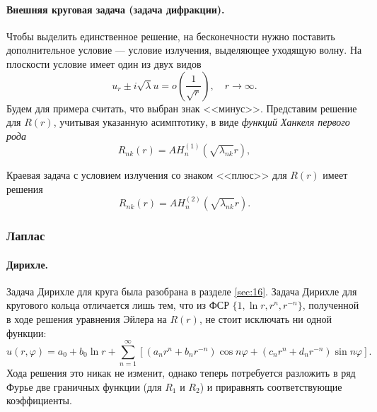 \paragraph{Внешняя круговая задача (задача дифракции).}
Чтобы выделить единственное решение, на бесконечности нужно поставить
дополнительное условие --- условие излучения, выделяющее уходящую волну. На
плоскости условие имеет один из двух видов 
\[
u_r \pm i\sqrt\lambda u = o \left( \frac{1}{\sqrt r} \right), \quad
r\to\infty.
\]
Будем для примера считать, что выбран знак <<минус>>. Представим решение для $ R(r) $, учитывая указанную асимптотику, в виде
\emph{функций Ханкеля первого рода} 
\[
R_{nk}(r) = A H^{(1)}_n(\sqrt{\lambda_{nk}} r),
\]


Краевая задача с условием излучения со знаком <<плюс>> для $ R(r) $ имеет
решения  
\[
R_{nk}(r) = AH^{(2)}_n(\sqrt{\lambda_{nk}} r).
\]




\subsubsection{Лаплас}
\paragraph{Дирихле.} Задача Дирихле для круга была разобрана в разделе \ref{sec:16}. Задача Дирихле
для кругового кольца отличается лишь тем, что из ФСР $ \{1, \ln r, r^n, r^{-n}\}
$, полученной в ходе решения уравнения Эйлера на $ R(r) $, не стоит исключать ни
одной функции:
\[
u(r,\varphi) = a_0 + b_0\ln r + \sum_{n=1}^\infty [(a_nr^n + b_nr^{-n})\cos
n\varphi + (c_n r^n + d_n r^{-n})\sin n\varphi].
\]
Хода решения это никак не изменит, однако теперь потребуется
разложить в ряд Фурье две граничных функции (для $ R_1 $ и $ R_2 $) и приравнять
соответствующие коэффициенты.

